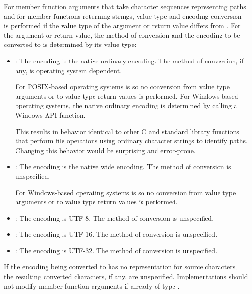 \pnum
For member function arguments that take character sequences representing
paths and for member functions returning strings, value type and encoding
conversion is performed if the value type of the argument or return value differs from
.
For the argument or return value, the method of conversion and the encoding
to be converted to is determined
by its value type:
\begin{itemize}
\item {}: The encoding is the native ordinary encoding.
The method of conversion, if any, is operating system dependent.
\begin{note}
For POSIX-based operating systems  is 
so no conversion from  value type arguments or to 
value type return values is performed.
For Windows-based operating systems, the
native ordinary encoding is determined by calling a Windows API function.
\end{note}
\begin{note}
This results in behavior identical to other C and \Cpp{}
standard library functions that perform file operations using ordinary character
strings to identify paths. Changing this behavior would be surprising and
error-prone.
\end{note}
\item {}: The encoding is the native wide encoding.
The method of conversion is unspecified.
\begin{note}
For Windows-based operating systems  is 
so no conversion from  value type arguments or to 
value type return values is performed.
\end{note}
\item
{}%
: The encoding is UTF-8. The method of conversion
is unspecified.
\item
{}%
: The encoding is UTF-16. The method of conversion
is unspecified.
\item
{}%
: The encoding is UTF-32. The method of conversion
is unspecified.
\end{itemize}

\pnum
If the encoding being converted to has no representation for source
characters, the resulting converted characters, if any, are unspecified.
Implementations should not modify member function arguments
if already of type .

